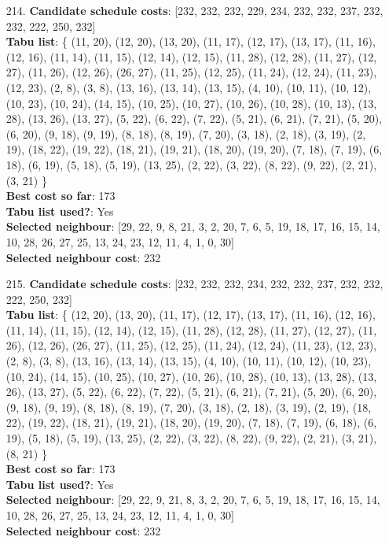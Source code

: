 \documentclass[fleqn]{article}
\begin{document}
\begin{itemize}
    \item[214.] \textbf{Candidate schedule costs}: [232, 232, 232, 229, 234, 232, 232, 237, 232, 232, 222, 250, 232] \\
    \textbf{Tabu list}: \{ (11, 20), (12, 20), (13, 20), (11, 17), (12, 17), (13, 17), (11, 16), (12, 16), (11, 14), (11, 15), (12, 14), (12, 15), (11, 28), (12, 28), (11, 27), (12, 27), (11, 26), (12, 26), (26, 27), (11, 25), (12, 25), (11, 24), (12, 24), (11, 23), (12, 23), (2, 8), (3, 8), (13, 16), (13, 14), (13, 15), (4, 10), (10, 11), (10, 12), (10, 23), (10, 24), (14, 15), (10, 25), (10, 27), (10, 26), (10, 28), (10, 13), (13, 28), (13, 26), (13, 27), (5, 22), (6, 22), (7, 22), (5, 21), (6, 21), (7, 21), (5, 20), (6, 20), (9, 18), (9, 19), (8, 18), (8, 19), (7, 20), (3, 18), (2, 18), (3, 19), (2, 19), (18, 22), (19, 22), (18, 21), (19, 21), (18, 20), (19, 20), (7, 18), (7, 19), (6, 18), (6, 19), (5, 18), (5, 19), (13, 25), (2, 22), (3, 22), (8, 22), (9, 22), (2, 21), (3, 21) \} \\
    \textbf{Best cost so far}: 173 \\
    \textbf{Tabu list used?}: Yes \\
    \textbf{Selected neighbour}: [29, 22, 9, 8, 21, 3, 2, 20, 7, 6, 5, 19, 18, 17, 16, 15, 14, 10, 28, 26, 27, 25, 13, 24, 23, 12, 11, 4, 1, 0, 30] \\
    \textbf{Selected neighbour cost}: 232
      

    \item[215.] \textbf{Candidate schedule costs}: [232, 232, 232, 234, 232, 232, 237, 232, 232, 222, 250, 232] \\
    \textbf{Tabu list}: \{ (12, 20), (13, 20), (11, 17), (12, 17), (13, 17), (11, 16), (12, 16), (11, 14), (11, 15), (12, 14), (12, 15), (11, 28), (12, 28), (11, 27), (12, 27), (11, 26), (12, 26), (26, 27), (11, 25), (12, 25), (11, 24), (12, 24), (11, 23), (12, 23), (2, 8), (3, 8), (13, 16), (13, 14), (13, 15), (4, 10), (10, 11), (10, 12), (10, 23), (10, 24), (14, 15), (10, 25), (10, 27), (10, 26), (10, 28), (10, 13), (13, 28), (13, 26), (13, 27), (5, 22), (6, 22), (7, 22), (5, 21), (6, 21), (7, 21), (5, 20), (6, 20), (9, 18), (9, 19), (8, 18), (8, 19), (7, 20), (3, 18), (2, 18), (3, 19), (2, 19), (18, 22), (19, 22), (18, 21), (19, 21), (18, 20), (19, 20), (7, 18), (7, 19), (6, 18), (6, 19), (5, 18), (5, 19), (13, 25), (2, 22), (3, 22), (8, 22), (9, 22), (2, 21), (3, 21), (8, 21) \} \\
    \textbf{Best cost so far}: 173 \\
    \textbf{Tabu list used?}: Yes \\
    \textbf{Selected neighbour}: [29, 22, 9, 21, 8, 3, 2, 20, 7, 6, 5, 19, 18, 17, 16, 15, 14, 10, 28, 26, 27, 25, 13, 24, 23, 12, 11, 4, 1, 0, 30] \\
    \textbf{Selected neighbour cost}: 232
      


\end{itemize}
\end{document}
